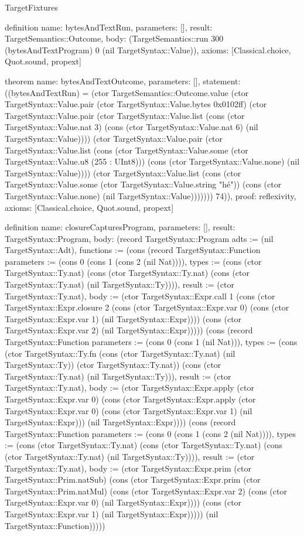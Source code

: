 \begin{lexlean}{TargetFixtures}
\begin{semanticmodule}
definition{
  name: bytesAndTextRun,
  parameters: [],
  result: TargetSemantics::Outcome,
  body: (TargetSemantics::run 300 (bytesAndTextProgram) 0 (nil TargetSyntax::Value)),
  axioms: [Classical.choice, Quot.sound, propext]
}

theorem{
  name: bytesAndTextOutcome,
  parameters: [],
  statement: ((bytesAndTextRun) = (ctor TargetSemantics::Outcome.value (ctor TargetSyntax::Value.pair (ctor TargetSyntax::Value.bytes 0x0102ff) (ctor TargetSyntax::Value.pair (ctor TargetSyntax::Value.list (cons (ctor TargetSyntax::Value.nat 3) (cons (ctor TargetSyntax::Value.nat 6) (nil TargetSyntax::Value)))) (ctor TargetSyntax::Value.pair (ctor TargetSyntax::Value.list (cons (ctor TargetSyntax::Value.some (ctor TargetSyntax::Value.u8 (255 : UInt8))) (cons (ctor TargetSyntax::Value.none) (nil TargetSyntax::Value)))) (ctor TargetSyntax::Value.list (cons (ctor TargetSyntax::Value.some (ctor TargetSyntax::Value.string "hé")) (cons (ctor TargetSyntax::Value.none) (nil TargetSyntax::Value))))))) 74)),
  proof: reflexivity{},
  axioms: [Classical.choice, Quot.sound, propext]
}

definition{
  name: closureCapturesProgram,
  parameters: [],
  result: TargetSyntax::Program,
  body: (record TargetSyntax::Program {adts := (nil TargetSyntax::Adt), functions := (cons (record TargetSyntax::Function {parameters := (cons 0 (cons 1 (cons 2 (nil Nat)))), types := (cons (ctor TargetSyntax::Ty.nat) (cons (ctor TargetSyntax::Ty.nat) (cons (ctor TargetSyntax::Ty.nat) (nil TargetSyntax::Ty)))), result := (ctor TargetSyntax::Ty.nat), body := (ctor TargetSyntax::Expr.call 1 (cons (ctor TargetSyntax::Expr.closure 2 (cons (ctor TargetSyntax::Expr.var 0) (cons (ctor TargetSyntax::Expr.var 1) (nil TargetSyntax::Expr)))) (cons (ctor TargetSyntax::Expr.var 2) (nil TargetSyntax::Expr))))}) (cons (record TargetSyntax::Function {parameters := (cons 0 (cons 1 (nil Nat))), types := (cons (ctor TargetSyntax::Ty.fn (cons (ctor TargetSyntax::Ty.nat) (nil TargetSyntax::Ty)) (ctor TargetSyntax::Ty.nat)) (cons (ctor TargetSyntax::Ty.nat) (nil TargetSyntax::Ty))), result := (ctor TargetSyntax::Ty.nat), body := (ctor TargetSyntax::Expr.apply (ctor TargetSyntax::Expr.var 0) (cons (ctor TargetSyntax::Expr.apply (ctor TargetSyntax::Expr.var 0) (cons (ctor TargetSyntax::Expr.var 1) (nil TargetSyntax::Expr))) (nil TargetSyntax::Expr)))}) (cons (record TargetSyntax::Function {parameters := (cons 0 (cons 1 (cons 2 (nil Nat)))), types := (cons (ctor TargetSyntax::Ty.nat) (cons (ctor TargetSyntax::Ty.nat) (cons (ctor TargetSyntax::Ty.nat) (nil TargetSyntax::Ty)))), result := (ctor TargetSyntax::Ty.nat), body := (ctor TargetSyntax::Expr.prim (ctor TargetSyntax::Prim.natSub) (cons (ctor TargetSyntax::Expr.prim (ctor TargetSyntax::Prim.natMul) (cons (ctor TargetSyntax::Expr.var 2) (cons (ctor TargetSyntax::Expr.var 0) (nil TargetSyntax::Expr)))) (cons (ctor TargetSyntax::Expr.var 1) (nil TargetSyntax::Expr))))}) (nil TargetSyntax::Function))))})
}


\end{semanticmodule}
\end{lexlean}
